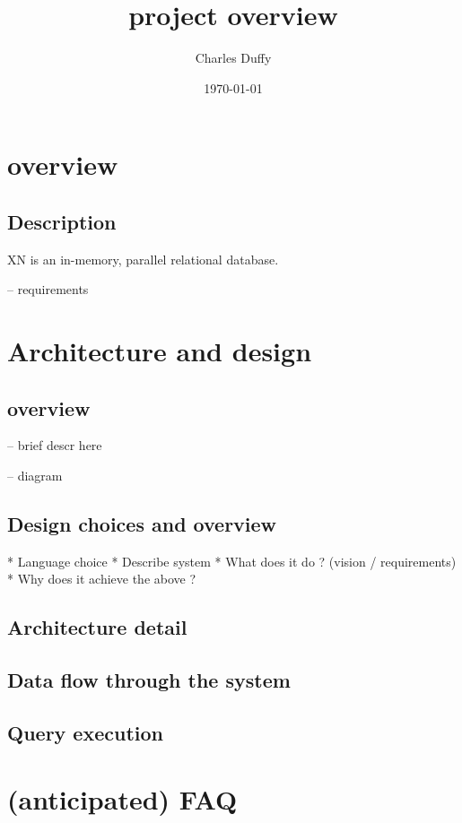 \documentclass[12pt]{article}
\title{project overview}
\author{Charles Duffy}
\date{\today}
\begin{document}
\maketitle
\section{overview} %
\subsection{Description}
XN is an in-memory, parallel relational database. 

-- requirements

\section{Architecture and design}

\subsection{overview}

-- brief descr here

-- diagram


\subsection{Design choices and overview}
* Language choice
* Describe system
* What does it do ? (vision / requirements)
* Why does it achieve the above ?

\subsection{Architecture detail}
\subsection{Data flow through the system}
\subsection{Query execution}
\subsection{}

\section{(anticipated) FAQ}
\end{document}
